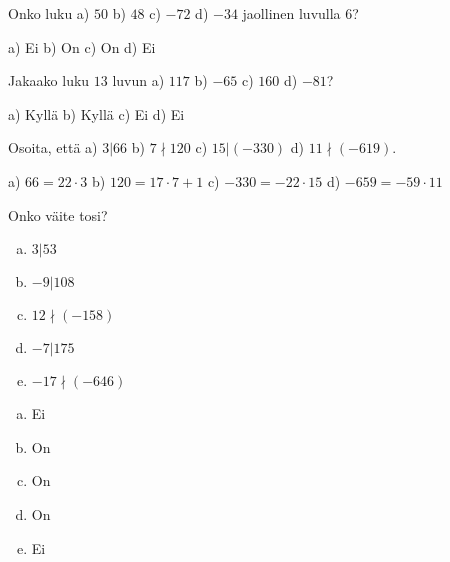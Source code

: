 \setcounter{tehtava}{0}

\begin{tehtavasivu}

\begin{tehtava}
    Onko luku a) $50$ b) $48$ c) $-72$ d) $-34$ jaollinen luvulla $6$?
    \begin{vastaus}
        a) Ei b) On c) On d) Ei
    \end{vastaus}

\end{tehtava}

\begin{tehtava}
    Jakaako luku $13$ luvun a) $117$ b) $-65$ c) $160$ d) $-81$?
    \begin{vastaus}
        a) Kyllä b) Kyllä c) Ei d) Ei 
    \end{vastaus}
\end{tehtava}

\begin{tehtava}
    Osoita, että a) $3|66$ b) $7\nmid 120$ c) $15|(-330)$ d) $11\nmid (-619)$.
    \begin{vastaus}
        a) $66 = 22\cdot 3$ b) $120 = 17\cdot 7 + 1$ c) $-330 = -22\cdot 15$ d) $-659 = -59\cdot 11$ 
    \end{vastaus}

\end{tehtava}

\begin{tehtava}
    Onko väite tosi?
    \begin{enumerate}[a)]
    \item $3|53$
    \item $-9|108$
    \item $12 \nmid (-158)$
    \item $-7|175$
    \item $-17 \nmid (-646)$
    \end{enumerate}
    
    \begin{vastaus}
        \begin{enumerate}[a)]
        \item Ei
        \item On
        \item On
        \item On
        \item Ei
        \end{enumerate}
    \end{vastaus}
\end{tehtava}


\end{tehtavasivu}
